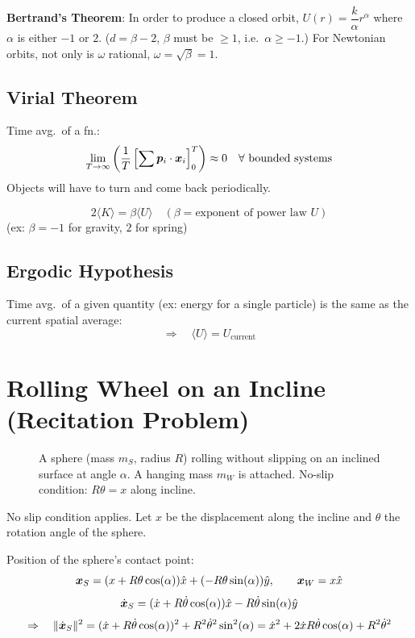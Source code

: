 \textbf{Bertrand's Theorem}: In order to produce a closed orbit, $U(r) = \dfrac{k}{\alpha}r^\alpha$ where $\alpha$ is either $-1$ or $2$. ($d = \beta - 2$, $\beta$ must be $\geq 1$, i.e.\ $\alpha \geq -1$.) For Newtonian orbits, not only is $\omega$ rational, $\omega = \sqrt{\beta} = 1$.

\subsection{Virial Theorem}

Time avg.\ of a fn.:
\[
    \lim_{T\to\infty}\left(\frac{1}{T}\left[\sum \bm{p}_i\cdot\bm{x}_i\right]_0^T\right) \approx 0
    \quad\forall\text{ bounded systems}
\]
Objects will have to turn and come back periodically.

\[
    2\langle K\rangle = \beta\langle U\rangle
    \quad (\beta = \text{exponent of power law }U)
\]
(ex: $\beta = -1$ for gravity, $2$ for spring)

\subsection{Ergodic Hypothesis}

Time avg.\ of a given quantity (ex: energy for a single particle) is the same as the current spatial average:
\[
    \Rightarrow\quad \langle U\rangle = U_\text{current}
\]


\section{Rolling Wheel on an Incline (Recitation Problem)}

\begin{figure}[H]
\centering
\caption{A sphere (mass $m_S$, radius $R$) rolling without slipping on an inclined surface at angle $\alpha$. A hanging mass $m_W$ is attached. No-slip condition: $R\theta = x$ along incline.}
\end{figure}

No slip condition applies. Let $x$ be the displacement along the incline and $\theta$ the rotation angle of the sphere.

Position of the sphere's contact point:
\[
    \bm{x}_S = (x + R\theta\cos(\alpha))\hat{x} + (-R\theta\sin(\alpha))\hat{y},
    \qquad \bm{x}_W = x\hat{x}
\]
\[
    \dot{\bm{x}}_S = (\dot x + R\dot\theta\cos(\alpha))\hat{x} - R\dot\theta\sin(\alpha)\hat{y}
\]
\[
    \Rightarrow\quad \|\dot{\bm{x}}_S\|^2
    = (\dot x + R\dot\theta\cos(\alpha))^2 + R^2\dot\theta^2\sin^2(\alpha)
    = \dot x^2 + 2\dot x R\dot\theta\cos(\alpha) + R^2\dot\theta^2
\]


